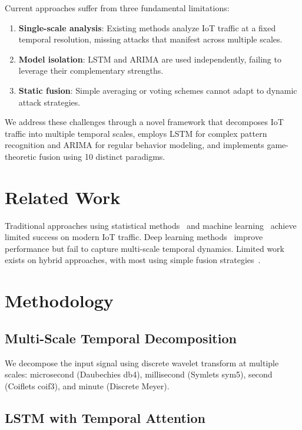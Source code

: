 \documentclass[10pt,conference]{IEEEtran}
\begin{document}
Current approaches suffer from three fundamental limitations:
\begin{enumerate}
    \item \textbf{Single-scale analysis}: Existing methods analyze IoT traffic at a fixed temporal resolution, missing attacks that manifest across multiple scales.
    \item \textbf{Model isolation}: LSTM and ARIMA are used independently, failing to leverage their complementary strengths.
    \item \textbf{Static fusion}: Simple averaging or voting schemes cannot adapt to dynamic attack strategies.
\end{enumerate}

We address these challenges through a novel framework that decomposes IoT traffic into multiple temporal scales, employs LSTM for complex pattern recognition and ARIMA for regular behavior modeling, and implements game-theoretic fusion using 10 distinct paradigms.

\section{Related Work}

Traditional approaches using statistical methods~\cite{stats_anomaly} and machine learning~\cite{svm_iot,rf_detection} achieve limited success on modern IoT traffic. Deep learning methods~\cite{dl_survey} improve performance but fail to capture multi-scale temporal dynamics. Limited work exists on hybrid approaches, with most using simple fusion strategies~\cite{anomaly_survey}.

\section{Methodology}

\subsection{Multi-Scale Temporal Decomposition}

We decompose the input signal using discrete wavelet transform at multiple scales: microsecond (Daubechies db4), millisecond (Symlets sym5), second (Coiflets coif3), and minute (Discrete Meyer).

\subsection{LSTM with Temporal Attention}
\end{document}
